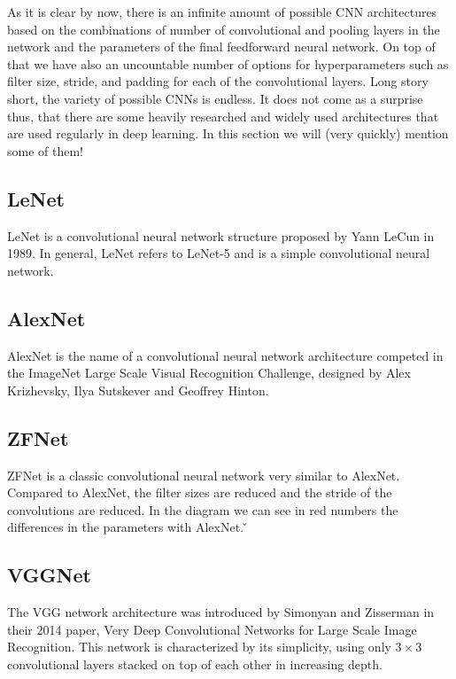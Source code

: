 As it is clear by now, there is an infinite amount of possible CNN architectures based on the combinations of number
of convolutional and pooling layers in the network and the parameters of the final feedforward neural network. On top
of that we have also an uncountable number of options for hyperparameters such as filter size, stride, and padding
for each of the convolutional layers. Long story short, the variety of possible CNNs is endless. It does not come as
a surprise thus, that there are some heavily researched and widely used architectures that are used regularly in deep
learning. In this section we will (very quickly) mention some of them!

\subsection*{LeNet}

LeNet is a convolutional neural network structure proposed by Yann LeCun in 1989. In general, LeNet refers to LeNet-5
and is a simple convolutional neural network.


\subsection*{AlexNet}

AlexNet is the name of a convolutional neural network architecture competed in the ImageNet Large Scale Visual
Recognition Challenge, designed by Alex Krizhevsky, Ilya Sutskever and Geoffrey Hinton.


\subsection*{ZFNet}

ZFNet is a classic convolutional neural network very similar to AlexNet. Compared to AlexNet, the filter sizes are
reduced and the stride of the convolutions are reduced. In the diagram we can see in red numbers the differences in
the parameters with AlexNet. \v


\subsection*{VGGNet}

The VGG network architecture was introduced by Simonyan and Zisserman in their 2014 paper, Very Deep Convolutional
Networks for Large Scale Image Recognition. This network is characterized by its simplicity, using only $3 \times 3$
convolutional layers stacked on top of each other in increasing depth.

